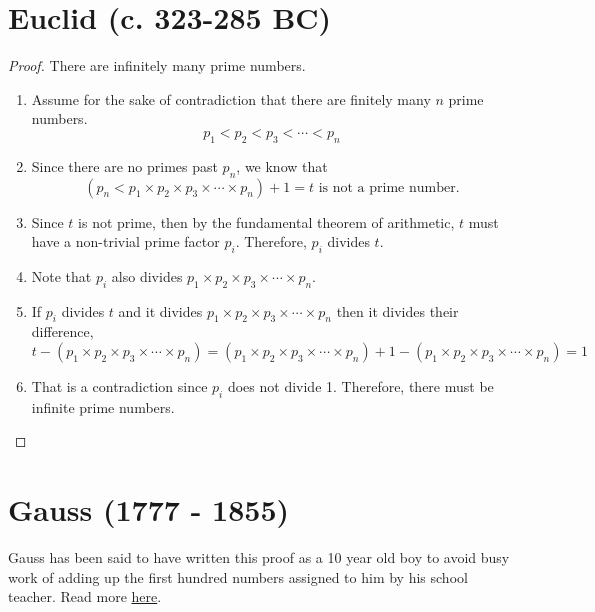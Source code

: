 \documentclass{homework}
\begin{document}
\section{Euclid (c. 323-285 BC)}

\begin{proof} There are infinitely many prime numbers.
    \begin{enumerate}
        \item Assume for the sake of contradiction that there are finitely many $n$ prime numbers.
              \[
                  p_1 < p_2 < p_3 < \cdots < p_n
              \]
        \item Since there are no primes past $p_n$, we know that
              \[
                  (p_n < p_1 \times p_2 \times p_3 \times \cdots \times p_n) + 1 = t \text{ is not a prime number.}
              \]
        \item Since $t$ is not prime, then by the fundamental theorem of arithmetic, $t$ must have a non-trivial prime factor $p_i$. Therefore, $p_i$ divides $t$.
        \item Note that $p_i$ also divides $p_1 \times p_2 \times p_3 \times \cdots \times p_n$.
        \item If $p_i$ divides $t$ and it divides $p_1 \times p_2 \times p_3 \times \cdots \times p_n$ then it divides their difference,
              \[
                  t - (p_1 \times p_2 \times p_3 \times \cdots \times p_n) = (p_1 \times p_2 \times p_3 \times \cdots \times p_n)+1-(p_1 \times p_2 \times p_3 \times \cdots \times p_n)=1
              \]
        \item That is a contradiction since $p_i$ does not divide 1. Therefore, there must be infinite prime numbers.
    \end{enumerate}
\end{proof}

\section{Gauss (1777 - 1855)}

Gauss has been said to have written this proof as a 10 year old boy to avoid busy work of adding up the first hundred numbers assigned to him by his school teacher. Read more \href{http://bit-player.org/wp-content/extras/gaussfiles/gauss-snippets.html}{here}.
\end{document}
